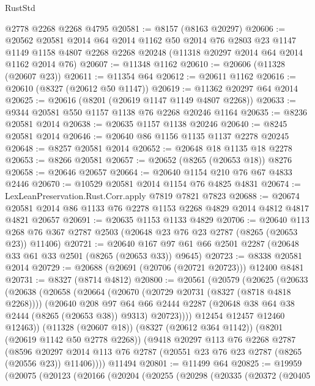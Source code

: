 \begin{lexlean}{RustStd}
\begin{coremodule}
    @2778
    @2268
    @2268
    @4795
@20581 := @8157 (@8163 @20297)
@20606 := @20562
    @20581
    @2014
    @64
    @2014
    @1162
    @50
    @2014
    @76
    @2803
    @23
    @1147
    @1149
    @1158
    @4807
    @2268
    @2268
    @20248
    (@11318 @20297 @2014 @64 @2014 @1162 @2014 @76)
@20607 := @11348 @1162
@20610 := @20606 (@11328 (@20607 @23))
@20611 := @11354 @64
@20612 := @20611 @1162
@20616 := @20610 (@8327 (@20612 @50 @1147))
@20619 := @11362 @20297 @64 @2014
@20625 := @20616 (@8201 (@20619 @1147 @1149 @4807 @2268))
@20633 := @9344 @20581 @550 @1157 @1138 @76 @2268 @20246 @1164
@20635 := @8236 @20581 @2014
@20638 := @20635 @1157 @1138 @20246
@20640 := @8245 @20581 @2014
@20646 := @20640 @86 @1156 @1135 @1137 @2278 @20245
@20648 := @8257 @20581 @2014
@20652 := @20648 @18 @1135 @18 @2278
@20653 := @8266 @20581
@20657 := @20652 (@8265 (@20653 @18)) @8276
@20658 := @20646 @20657
@20664 := @20640 @1154 @210 @76 @67 @4833 @2446
@20670 := @10529 @20581 @2014 @1154 @76 @4825 @4831
@20674 := LexLeanPreservation.Rust.Corr.apply @7819 @7821 @7823
@20688 := @20674 @20581 @2014 @86 @1133 @76 @2278 @1153 @2268 @4829 @2014 @4812 @4817 @4821 @20657
@20691 := @20635 @1153 @1133 @4829
@20706 := @20640
    @113
    @268
    @76
    @367
    @2787
    @2503
    (@20648 @23 @76 @23 @2787 (@8265 (@20653 @23)) @11406)
@20721 := @20640 @167 @97 @61 @66 @2501 @2287 (@20648 @33 @61 @33 @2501 (@8265 (@20653 @33)) @9645)
@20723 := @8338 @20581 @2014
@20729 := @20688 (@20691 (@20706 (@20721 @20723))) @12400 @8481
@20731 := @8327 (@8714 @4812)
@20800 := @20561
    (@20579
      (@20625
        (@20633
          (@20638
            (@20658
              (@20664
                (@20670 (@20729 @20731 (@8327 (@8718 @4818 @2268))))
                (@20640
                  @208
                  @97
                  @64
                  @66
                  @2444
                  @2287
                  (@20648 @38 @64 @38 @2444 (@8265 (@20653 @38)) @9313)
                  @20723))))
          @12454
          @12457
          @12460
          @12463))
      (@11328 (@20607 @18))
      (@8327 (@20612 @364 @1142))
      (@8201 (@20619 @1142 @50 @2778 @2268))
      (@9418
        @20297
        @113
        @76
        @2268
        @2787
        (@8596 @20297 @2014 @113 @76 @2787 (@20551 @23 @76 @23 @2787 (@8265 (@20556 @23)) @11406))))
    @11494
@20801 := @11499 @64
@20825 := @19959
    (@20075
      (@20123
        (@20166
          (@20204
            (@20255
              (@20298
                (@20335
                  (@20372
                    (@20405

\end{coremodule}
\end{lexlean}
